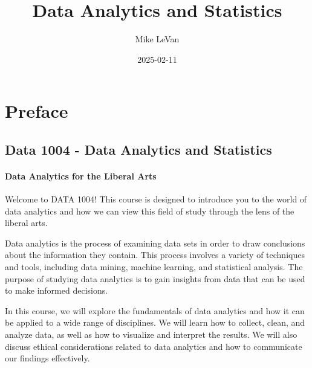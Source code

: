\documentclass[
  letterpaper,
  DIV=11,
  numbers=noendperiod]{scrreprt}
\title{Data Analytics and Statistics}
\author{Mike LeVan}
\date{2025-02-11}
\renewcommand*\contentsname{Table of contents}
\newcommand\contentsname{Table of contents}
\begin{document}
\maketitle

\renewcommand*\contentsname{Table of contents}
{
\hypersetup{linkcolor=}
\setcounter{tocdepth}{2}
\tableofcontents
}


\chapter*{Preface}\label{preface}


\section*{Data 1004 - Data Analytics and
Statistics}\label{data-1004---data-analytics-and-statistics}


\subsubsection*{Data Analytics for the Liberal
Arts}\label{data-analytics-for-the-liberal-arts}

Welcome to DATA 1004! This course is designed to introduce you to the
world of data analytics and how we can view this field of study through
the lens of the liberal arts.

Data analytics is the process of examining data sets in order to draw
conclusions about the information they contain. This process involves a
variety of techniques and tools, including data mining, machine
learning, and statistical analysis. The purpose of studying data
analytics is to gain insights from data that can be used to make
informed decisions.

In this course, we will explore the fundamentals of data analytics and
how it can be applied to a wide range of disciplines. We will learn how
to collect, clean, and analyze data, as well as how to visualize and
interpret the results. We will also discuss ethical considerations
related to data analytics and how to communicate our findings
effectively.
\end{document}

